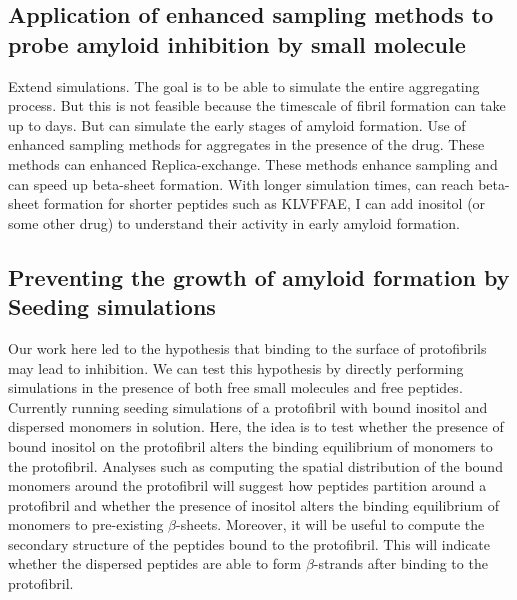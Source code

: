 



\subsection{Application of enhanced sampling methods to probe amyloid inhibition by small molecule}
Extend simulations. The goal is to be able to simulate the entire aggregating process.  But this is not feasible because the timescale of fibril formation can take up to days. But can simulate the early stages of amyloid formation.  Use of enhanced sampling methods for aggregates in the presence of the drug.  These methods can enhanced Replica-exchange.  These methods enhance sampling and can speed up beta-sheet formation. With longer simulation times, can reach beta-sheet formation for shorter peptides such as KLVFFAE, I can add inositol (or some other drug) to understand their activity in early amyloid formation.

\subsection{Preventing the growth of amyloid formation by Seeding simulations}
Our work here led to the hypothesis that binding to the surface of protofibrils may lead to inhibition. We can test this hypothesis by directly performing simulations in the presence of both free small molecules and free peptides. Currently running seeding simulations of a protofibril with bound inositol and dispersed monomers in solution. Here, the idea is to test whether the presence of bound inositol on the protofibril alters the binding equilibrium of monomers to the protofibril. 
Analyses such as computing the spatial distribution of the bound monomers around the protofibril will suggest how peptides partition around a protofibril and whether the presence of inositol alters the binding equilibrium of monomers to pre-existing $\beta$-sheets. Moreover, it will be useful to compute the secondary structure of the peptides bound to the protofibril.  This will indicate whether the dispersed peptides are able to form $\beta$-strands after binding to the protofibril.

